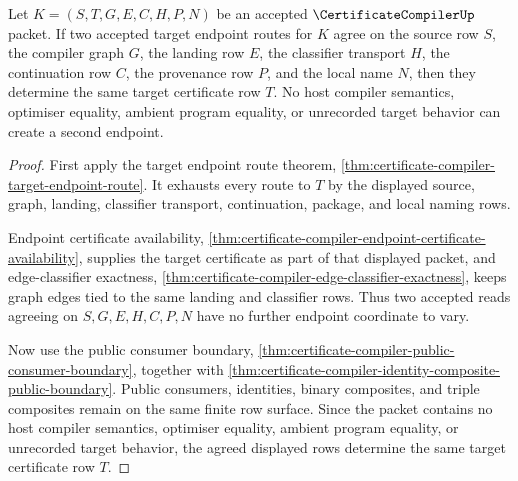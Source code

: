 \begin{theorem}
\label{thm:certificate-compiler-endpoint-determinacy}
Let $K=(S,T,G,E,C,H,P,N)$ be an accepted $\CertificateCompilerUp$ packet. If
two accepted target endpoint routes for $K$ agree on the source row $S$, the
compiler graph $G$, the landing row $E$, the classifier transport $H$, the
continuation row $C$, the provenance row $P$, and the local name $N$, then
they determine the same target certificate row $T$. No host compiler
semantics, optimiser equality, ambient program equality, or unrecorded target
behavior can create a second endpoint.
\end{theorem}
\begin{proof}
First apply the target endpoint route theorem,
\autoref{thm:certificate-compiler-target-endpoint-route}. It exhausts every
route to $T$ by the displayed source, graph, landing, classifier transport,
continuation, package, and local naming rows.

Endpoint certificate availability,
\autoref{thm:certificate-compiler-endpoint-certificate-availability}, supplies
the target certificate as part of that displayed packet, and edge-classifier
exactness, \autoref{thm:certificate-compiler-edge-classifier-exactness}, keeps
graph edges tied to the same landing and classifier rows. Thus two accepted
reads agreeing on $S,G,E,H,C,P,N$ have no further endpoint coordinate to vary.

Now use the public consumer boundary,
\autoref{thm:certificate-compiler-public-consumer-boundary}, together with
\autoref{thm:certificate-compiler-identity-composite-public-boundary}. Public
consumers, identities, binary composites, and triple composites remain on the
same finite row surface. Since the packet contains no host compiler semantics,
optimiser equality, ambient program equality, or unrecorded target behavior,
the agreed displayed rows determine the same target certificate row $T$.
\end{proof}

